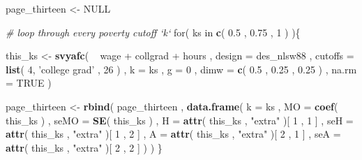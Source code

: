 \documentclass[]{book}
\newenvironment{Shaded}{\begin{snugshade}}{\end{snugshade}}
\newcommand{\KeywordTok}[1]{\textcolor[rgb]{0.13,0.29,0.53}{\textbf{{#1}}}}
\newcommand{\DataTypeTok}[1]{\textcolor[rgb]{0.13,0.29,0.53}{{#1}}}
\newcommand{\DecValTok}[1]{\textcolor[rgb]{0.00,0.00,0.81}{{#1}}}
\newcommand{\FloatTok}[1]{\textcolor[rgb]{0.00,0.00,0.81}{{#1}}}
\newcommand{\StringTok}[1]{\textcolor[rgb]{0.31,0.60,0.02}{{#1}}}
\newcommand{\CommentTok}[1]{\textcolor[rgb]{0.56,0.35,0.01}{\textit{{#1}}}}
\newcommand{\OtherTok}[1]{\textcolor[rgb]{0.56,0.35,0.01}{{#1}}}
\newcommand{\NormalTok}[1]{{#1}}
\begin{document}
\begin{Shaded}
\begin{Highlighting}[]
\NormalTok{page_thirteen <-}\StringTok{ }\OtherTok{NULL}

\CommentTok{# loop through every poverty cutoff `k`}
\NormalTok{for( ks in }\KeywordTok{c}\NormalTok{( }\FloatTok{0.5} \NormalTok{, }\FloatTok{0.75} \NormalTok{, }\DecValTok{1} \NormalTok{) )\{}
    
    \NormalTok{this_ks <-}
\StringTok{        }\KeywordTok{svyafc}\NormalTok{(}
        \NormalTok{~}\StringTok{ }\NormalTok{wage +}\StringTok{ }\NormalTok{collgrad +}\StringTok{ }\NormalTok{hours , }
        \DataTypeTok{design =} \NormalTok{des_nlsw88 , }
        \DataTypeTok{cutoffs =} \KeywordTok{list}\NormalTok{( }\DecValTok{4}\NormalTok{, }\StringTok{'college grad'} \NormalTok{, }\DecValTok{26} \NormalTok{) , }
        \DataTypeTok{k =} \NormalTok{ks , }
        \DataTypeTok{g =} \DecValTok{0} \NormalTok{, }
        \DataTypeTok{dimw =} \KeywordTok{c}\NormalTok{( }\FloatTok{0.5} \NormalTok{, }\FloatTok{0.25} \NormalTok{, }\FloatTok{0.25} \NormalTok{) ,}
        \DataTypeTok{na.rm =} \OtherTok{TRUE}
      \NormalTok{)}
    
    \NormalTok{page_thirteen <-}
\StringTok{        }\KeywordTok{rbind}\NormalTok{(}
            \NormalTok{page_thirteen ,}
            \KeywordTok{data.frame}\NormalTok{( }
                \DataTypeTok{k =} \NormalTok{ks , }
                \DataTypeTok{MO =} \KeywordTok{coef}\NormalTok{( this_ks ) ,}
                \DataTypeTok{seMO =} \KeywordTok{SE}\NormalTok{( this_ks ) ,}
                \DataTypeTok{H =} \KeywordTok{attr}\NormalTok{( this_ks , }\StringTok{"extra"} \NormalTok{)[ }\DecValTok{1} \NormalTok{, }\DecValTok{1} \NormalTok{] ,}
                \DataTypeTok{seH =} \KeywordTok{attr}\NormalTok{( this_ks , }\StringTok{"extra"} \NormalTok{)[ }\DecValTok{1} \NormalTok{, }\DecValTok{2} \NormalTok{] ,}
                \DataTypeTok{A =} \KeywordTok{attr}\NormalTok{( this_ks , }\StringTok{"extra"} \NormalTok{)[ }\DecValTok{2} \NormalTok{, }\DecValTok{1} \NormalTok{] ,}
                \DataTypeTok{seA =} \KeywordTok{attr}\NormalTok{( this_ks , }\StringTok{"extra"} \NormalTok{)[ }\DecValTok{2} \NormalTok{, }\DecValTok{2} \NormalTok{]}
          \NormalTok{)}
        \NormalTok{)}
\NormalTok{\}}
\end{Highlighting}
\end{Shaded}
\end{document}
